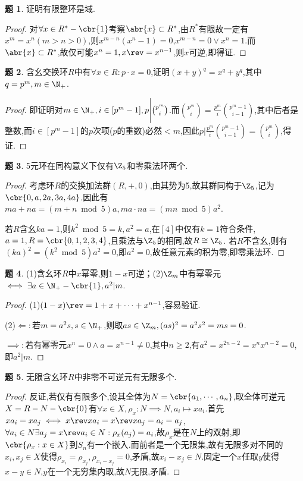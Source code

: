 \documentclass{article}
\theoremstyle{definition}
\newtheorem{exercise}{题}[section]
\begin{document}
\begin{exercise}
    证明有限整环是域.
\end{exercise}
\begin{proof}
    对$\forall x\in R^*-\cbr{1}$考察$\abr{x}\subset R^*$,由$R^*$有限故一定有$x^m=x^n(m>n>0)$,则$x^{m-n}(x^n-1)=0$,$x^{m-n}=0\lor x^n=1$.而$\abr{x}\subset R^*$,故仅可能$x^n=1, x\rev=x^{n-1}$,则$x$可逆,即得证.
\end{proof}

\begin{exercise}
    含幺交换环$R$中有$\forall x\in R: p\cdot x=0$,证明$(x+y)^q=x^q+y^q$,其中$q=p^m, m\in \N_+$.
\end{exercise}
\begin{proof}
    即证明对$ m\in \N_+, i\in [p^{m}-1], p\Bigg|\binom{p^m}{i}$.而$ \binom{p^m}{i}=\frac{p^m}{i}\binom{p^m-1}{i-1}$,其中后者是整数,而$i\in [p^m-1]$的$p$次项($p$的重数)必然$<m$,因此$p\Bigg|\frac{p^m}{i}\binom{p^m-1}{i-1}=\binom{p^m}{i}$,得证.
\end{proof}

\begin{exercise}
    5元环在同构意义下仅有$\Z_5$和零乘法环两个.
\end{exercise}
\begin{proof}
    考虑环$R$的交换加法群$(R,+,0)$,由其势为5,故其群同构于$\Z_5$,记为$\cbr{0,a,2a,3a,4a}$.因此有$ma+na=(m+n \bmod 5)a, ma\cdot na=(mn\bmod 5)a^2$.

    若$R$含幺$ka=1$,则$k^2\bmod 5=k, a^2=a$,在$[4]$中仅有$k=1$符合条件,$a=1, R=\cbr{0,1,2,3,4}$,且乘法与$\Z_5$的相同,故$R\cong\Z_5$.
若$R$不含幺,则有$(ka)^2=(k^2\bmod 5)a^2=0$,即$a^2=0$,故任意元素的积为零,即零乘法环.
\end{proof}

\begin{exercise}
    (1)含幺环$R$中$x$幂零,则$1-x$可逆；(2)$\Z_m$中有幂零元$\iff \exists a\in \N_+-\cbr{1}, a^2|m$.
\end{exercise}
\begin{proof}
    (1)$(1-x)\rev=1+x+\cdots+x^{n-1}$,容易验证.

    (2)$\Longleftarrow: $若$m=a^2s, s\in \N_+$,则取$as\in \Z_m, (as)^2=a^2s^2=ms=0$.

    $\implies: $若有幂零元$x^n=0\land a=x^{n-1}\neq 0$,其中$n\geq 2$,有$a^2=x^{2n-2}=x^nx^{n-2}=0$,即$a^2|m$.
\end{proof}

\begin{exercise}
    无限含幺环$R$中非零不可逆元有无限多个.
\end{exercise}
\begin{proof}
    反证,若仅有有限多个,设其全体为$N=\cbr{a_1,\cdots,a_n}$,取全体可逆元$X=R-N-\cbr{0}$有$\forall x\in X, \rho_x:N\implies N, a_i\mapsto xa_i$.首先$xa_i=xa_j\iff x\rev xa_i=x\rev xa_j=a_i=a_j$,$\forall a_i\in N \exists a_j=x\rev a_i\in N: \rho_x(a_j)=a_i$,故$\rho_x$是在$N$上的双射,即$\cbr{\rho_x: x\in X}$到$S_n$有一个嵌入.而前者是一个无限集,故有无限多对不同的$x_i,x_j\in X$使得$\rho_{x_i}=\rho_{x_j}, \rho_{x_i-x_j}=0$,矛盾,故$x_i-x_j\in N$.固定一个$x$任取$y$使得$x-y\in N$,$y$在一个无穷集内取,故$N$无限,矛盾.
\end{proof}
\end{document}
